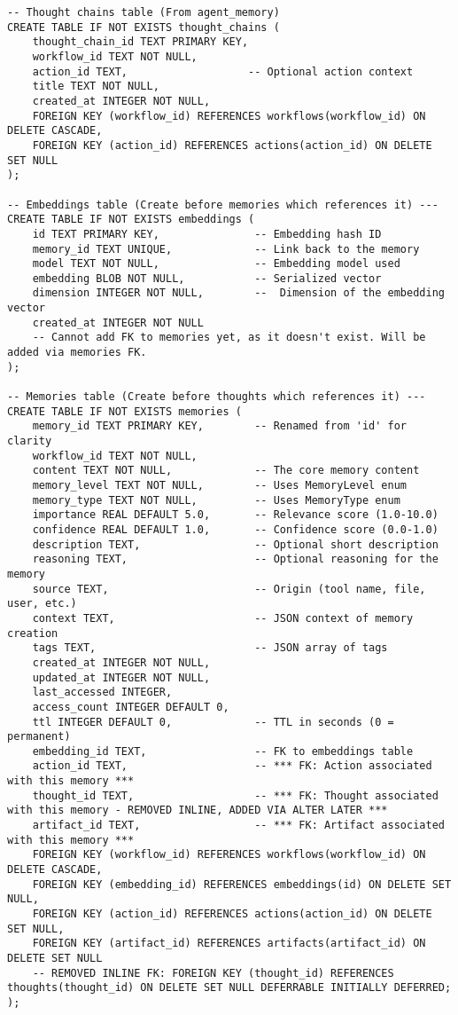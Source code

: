\documentclass[12pt,a4paper]{article}
\begin{document}
\begin{pageablecode}
\begin{verbatim}
-- Thought chains table (From agent_memory)
CREATE TABLE IF NOT EXISTS thought_chains (
    thought_chain_id TEXT PRIMARY KEY,
    workflow_id TEXT NOT NULL,
    action_id TEXT,                   -- Optional action context
    title TEXT NOT NULL,
    created_at INTEGER NOT NULL,
    FOREIGN KEY (workflow_id) REFERENCES workflows(workflow_id) ON DELETE CASCADE,
    FOREIGN KEY (action_id) REFERENCES actions(action_id) ON DELETE SET NULL
);

-- Embeddings table (Create before memories which references it) ---
CREATE TABLE IF NOT EXISTS embeddings (
    id TEXT PRIMARY KEY,               -- Embedding hash ID
    memory_id TEXT UNIQUE,             -- Link back to the memory
    model TEXT NOT NULL,               -- Embedding model used
    embedding BLOB NOT NULL,           -- Serialized vector
    dimension INTEGER NOT NULL,        --  Dimension of the embedding vector
    created_at INTEGER NOT NULL
    -- Cannot add FK to memories yet, as it doesn't exist. Will be added via memories FK.
);

-- Memories table (Create before thoughts which references it) ---
CREATE TABLE IF NOT EXISTS memories (
    memory_id TEXT PRIMARY KEY,        -- Renamed from 'id' for clarity
    workflow_id TEXT NOT NULL,
    content TEXT NOT NULL,             -- The core memory content
    memory_level TEXT NOT NULL,        -- Uses MemoryLevel enum
    memory_type TEXT NOT NULL,         -- Uses MemoryType enum
    importance REAL DEFAULT 5.0,       -- Relevance score (1.0-10.0)
    confidence REAL DEFAULT 1.0,       -- Confidence score (0.0-1.0)
    description TEXT,                  -- Optional short description
    reasoning TEXT,                    -- Optional reasoning for the memory
    source TEXT,                       -- Origin (tool name, file, user, etc.)
    context TEXT,                      -- JSON context of memory creation
    tags TEXT,                         -- JSON array of tags
    created_at INTEGER NOT NULL,
    updated_at INTEGER NOT NULL,
    last_accessed INTEGER,
    access_count INTEGER DEFAULT 0,
    ttl INTEGER DEFAULT 0,             -- TTL in seconds (0 = permanent)
    embedding_id TEXT,                 -- FK to embeddings table
    action_id TEXT,                    -- *** FK: Action associated with this memory ***
    thought_id TEXT,                   -- *** FK: Thought associated with this memory - REMOVED INLINE, ADDED VIA ALTER LATER ***
    artifact_id TEXT,                  -- *** FK: Artifact associated with this memory ***
    FOREIGN KEY (workflow_id) REFERENCES workflows(workflow_id) ON DELETE CASCADE,
    FOREIGN KEY (embedding_id) REFERENCES embeddings(id) ON DELETE SET NULL,
    FOREIGN KEY (action_id) REFERENCES actions(action_id) ON DELETE SET NULL,
    FOREIGN KEY (artifact_id) REFERENCES artifacts(artifact_id) ON DELETE SET NULL
    -- REMOVED INLINE FK: FOREIGN KEY (thought_id) REFERENCES thoughts(thought_id) ON DELETE SET NULL DEFERRABLE INITIALLY DEFERRED;
);


\end{verbatim}
\end{pageablecode}
\end{document}
